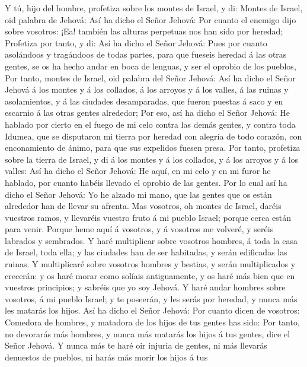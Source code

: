  Y tú, hijo del hombre, profetiza sobre los montes de
Israel, y di: Montes de Israel, oid palabra de Jehová:  Así
ha dicho el Señor Jehová: Por cuanto el enemigo dijo sobre vosotros:
¡Ea! también las alturas perpetuas nos han sido por heredad;
 Profetiza por tanto, y di: Así ha dicho el Señor Jehová:
Pues por cuanto asolándoos y tragándoos de todas partes, para que
fueseis heredad á las otras gentes, se os ha hecho andar en boca de
lenguas, y ser el oprobio de los pueblos,  Por tanto, montes
de Israel, oid palabra del Señor Jehová: Así ha dicho el Señor Jehová á
los montes y á los collados, á los arroyos y á los valles, á las ruinas
y asolamientos, y á las ciudades desamparadas, que fueron puestas á saco
y en escarnio á las otras gentes alrededor;  Por eso, así ha
dicho el Señor Jehová: He hablado por cierto en el fuego de mi celo
contra las demás gentes, y contra toda Idumea, que se disputaron mi
tierra por heredad con alegría de todo corazón, con enconamiento de
ánimo, para que sus expelidos fuesen presa.  Por tanto,
profetiza sobre la tierra de Israel, y di á los montes y á los collados,
y á los arroyos y á los valles: Así ha dicho el Señor Jehová: He aquí,
en mi celo y en mi furor he hablado, por cuanto habéis llevado el
oprobio de las gentes.  Por lo cual así ha dicho el Señor
Jehová: Yo he alzado mi mano, que las gentes que os están alrededor han
de llevar su afrenta.  Mas vosotros, oh montes de Israel,
daréis vuestros ramos, y llevaréis vuestro fruto á mi pueblo Israel;
porque cerca están para venir.  Porque heme aquí á vosotros,
y á vosotros me volveré, y seréis labrados y sembrados.  Y
haré multiplicar sobre vosotros hombres, á toda la casa de Israel, toda
ella; y las ciudades han de ser habitadas, y serán edificadas las
ruinas.  Y multiplicaré sobre vosotros hombres y bestias, y
serán multiplicados y crecerán: y os haré morar como solíais
antiguamente, y os haré más bien que en vuestros principios; y sabréis
que yo soy Jehová.  Y haré andar hombres sobre vosotros, á
mi pueblo Israel; y te poseerán, y les serás por heredad, y nunca más
les matarás los hijos.  Así ha dicho el Señor Jehová: Por
cuanto dicen de vosotros: Comedora de hombres, y matadora de los hijos
de tus gentes has sido:  Por tanto, no devorarás más
hombres, y nunca más matarás los hijos á tus gentes, dice el Señor
Jehová.  Y nunca más te haré oir injuria de gentes, ni más
llevarás denuestos de pueblos, ni harás más morir los hijos á tus
